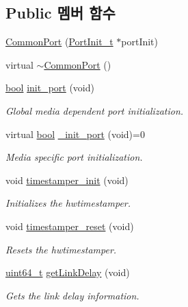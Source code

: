 \subsection*{Public 멤버 함수}
\begin{DoxyCompactItemize}
\item 
\hyperlink{class_common_port_ad9ae8813f6ab0d8c962ca271653b7da5}{Common\+Port} (\hyperlink{struct_port_init__t}{Port\+Init\+\_\+t} $\ast$port\+Init)
\item 
virtual \hyperlink{class_common_port_a639556a8c776973ebb206fceb722fc85}{$\sim$\+Common\+Port} ()
\item 
\hyperlink{avb__gptp_8h_af6a258d8f3ee5206d682d799316314b1}{bool} \hyperlink{class_common_port_ae2f86408116b0a551da01c6f92f03ff9}{init\+\_\+port} (void)
\begin{DoxyCompactList}\small\item\em Global media dependent port initialization. \end{DoxyCompactList}\item 
virtual \hyperlink{avb__gptp_8h_af6a258d8f3ee5206d682d799316314b1}{bool} \hyperlink{class_common_port_a5d364e6573c21517d6b9bd301a3f3543}{\+\_\+init\+\_\+port} (void)=0
\begin{DoxyCompactList}\small\item\em Media specific port initialization. \end{DoxyCompactList}\item 
void \hyperlink{class_common_port_a64530a2fb5ad64bdc7e61b2e37791191}{timestamper\+\_\+init} (void)
\begin{DoxyCompactList}\small\item\em Initializes the hwtimestamper. \end{DoxyCompactList}\item 
void \hyperlink{class_common_port_a8c575c35e2d432d8e401e48fa0cea8f8}{timestamper\+\_\+reset} (void)
\begin{DoxyCompactList}\small\item\em Resets the hwtimestamper. \end{DoxyCompactList}\item 
\hyperlink{parse_8c_aec6fcb673ff035718c238c8c9d544c47}{uint64\+\_\+t} \hyperlink{class_common_port_a62887d159222a2b222fb9cf7c97a3218}{get\+Link\+Delay} (void)
\begin{DoxyCompactList}\small\item\em Gets the link delay information. \end{DoxyCompactList}\item 

\end{DoxyCompactItemize}

